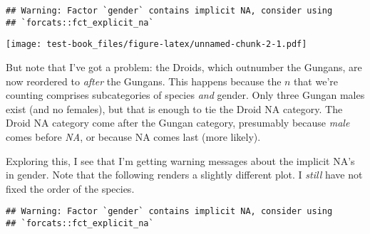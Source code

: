 \documentclass[]{book}
\newenvironment{Shaded}{\begin{snugshade}}{\end{snugshade}}
\newcommand{\DataTypeTok}[1]{\textcolor[rgb]{0.13,0.29,0.53}{#1}}
\newcommand{\DecValTok}[1]{\textcolor[rgb]{0.00,0.00,0.81}{#1}}
\newcommand{\KeywordTok}[1]{\textcolor[rgb]{0.13,0.29,0.53}{\textbf{#1}}}
\newcommand{\NormalTok}[1]{#1}
\newcommand{\OperatorTok}[1]{\textcolor[rgb]{0.81,0.36,0.00}{\textbf{#1}}}
\newcommand{\OtherTok}[1]{\textcolor[rgb]{0.56,0.35,0.01}{#1}}
\newcommand{\StringTok}[1]{\textcolor[rgb]{0.31,0.60,0.02}{#1}}
\begin{document}
\begin{verbatim}
## Warning: Factor `gender` contains implicit NA, consider using
## `forcats::fct_explicit_na`
\end{verbatim}

\texttt{[image: test-book\_files/figure-latex/unnamed-chunk-2-1.pdf]}

But note that I've got a problem: the Droids, which outnumber the Gungans, are now reordered to \emph{after} the Gungans. This happens because the \(n\) that we're counting comprises subcategories of species \emph{and} gender. Only three Gungan males exist (and no females), but that is enough to tie the Droid NA category. The Droid NA category come after the Gungan category, presumably because \emph{male} comes before \emph{NA}, or because NA comes last (more likely).

Exploring this, I see that I'm getting warning messages about the implicit NA's in gender. Note that the following renders a slightly different plot. I \emph{still} have not fixed the order of the species.

\begin{Shaded}
\end{Shaded}

\begin{verbatim}
## Warning: Factor `gender` contains implicit NA, consider using
## `forcats::fct_explicit_na`
\end{verbatim}
\end{document}
